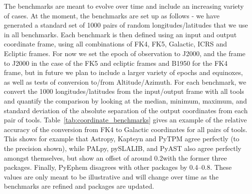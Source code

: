 \documentclass[modern]{aastex61}
\newcommand{\astropy}{Astropy\xspace}
\renewcommand{\tablename}{Table\xspace}
\newcommand{\inlinecomment}[2]{\todo[inline]{#1: #2}\xspace}
\begin{document}
The benchmarks are meant to evolve over time and include an increasing variety of cases. At the moment, the benchmarks are set up as follows - we have generated a standard set of 1000 pairs of random longitudes/latitudes that we use in all benchmarks. Each benchmark is then defined using an input and output coordinate frame, using all combinations of FK4, FK5, Galactic, ICRS and Ecliptic frames. For now we set the epoch of observation to J2000, and the frame to J2000 in the case of the FK5 and ecliptic frames and B1950 for the FK4 frame, but in future we plan to include a larger variety of epochs and equinoxes, as well as tests of conversion to/from Altitude/Azimuth. For each benchmark, we convert the 1000 longitudes/latitudes from the input/output frame with all tools and quantify the comparison by looking at the median, minimum, maximum, and standard deviation of the absolute separation of the output coordinates from each pair of tools. \tablename~\ref{tab:coordinate_benchmarks} gives an example of the relative accuracy of the conversion from FK4 to Galactic coordinates for all pairs of tools. This shows for example that \astropy, Kapteyn and PyTPM agree perfectly (to the precision shown), while PALpy, pySLALIB, and PyAST also agree perfectly amongst themselves, but show an offset of around 0.2\arcsec with the former three packages. Finally, PyEphem disagrees with other packages by 0.4--0.8\arcsec. These values are only meant to be illustrative and will change over time as the benchmarks are refined and packages are updated.
\end{document}
